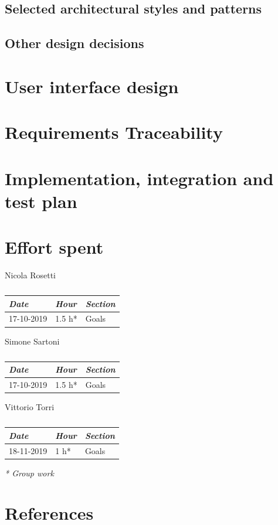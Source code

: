 \documentclass[a4paper]{report}
\begin{document}
\section{Selected architectural	styles and patterns}
\section{Other design decisions}

\chapter{User interface design}

\chapter{Requirements Traceability}

\chapter{Implementation, integration and test plan}

\chapter{Effort spent}

\begin{table}[H]
\centering
Nicola Rosetti \\
\begin{tabular}{p{2cm}p{1.5cm}p{7cm}}
\toprule
\textit{Date} & \textit{Hour} & \textit{Section} \\ \midrule
17-10-2019 & 1.5 h* & Goals \\ \midrule
\bottomrule
\end{tabular}
\caption[Nicola Rosetti's effort table]{}
\end{table}


\vspace*{1 cm}
\begin{table}[H]
\centering
Simone Sartoni \\
\begin{tabular}{p{2cm}p{1.5cm}p{7cm}}
\toprule
\textit{Date} & \textit{Hour} & \textit{Section} \\ \midrule
17-10-2019 & 1.5 h* & Goals \\ \midrule
\bottomrule
\end{tabular}
\caption[Simone Sartoni's effort table]{}
\end{table}
\vspace*{1 cm}
\begin{table}[H]
\centering
Vittorio Torri \\
\begin{tabular}{p{2cm}p{1.5cm}p{7cm}}
\toprule
\textit{Date} & \textit{Hour} & \textit{Section} \\ \midrule
18-11-2019 & 1 h* & Goals \\ \midrule
\bottomrule
\end{tabular}
\caption[Vittorio Torri's effort table]{}
\end{table}
\textit{* Group work}

\chapter{References}
\end{document}
